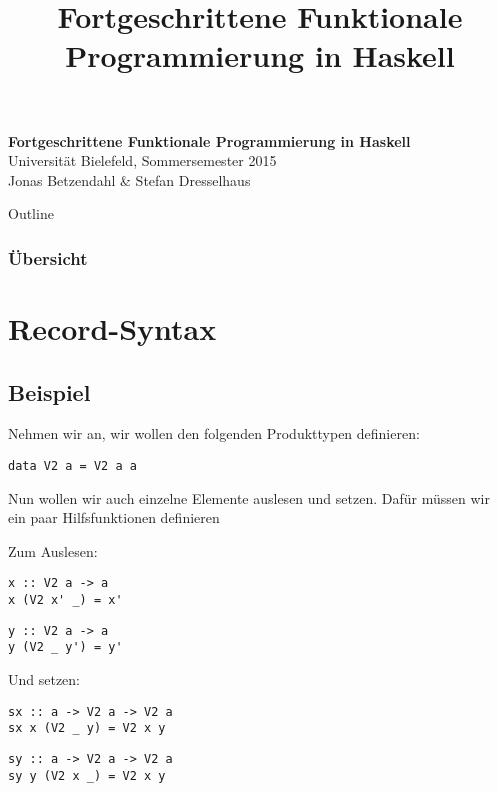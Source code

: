 \documentclass{beamer}
\title{Fortgeschrittene Funktionale Programmierung in Haskell}
\begin{document}
  

  \begin{frame}
  \begin{center}
    \Huge\textbf{Fortgeschrittene Funktionale Programmierung in Haskell}\\ \bigskip
    \LARGE Universität Bielefeld, Sommersemester 2015\\ \bigskip
    \large Jonas Betzendahl \& Stefan Dresselhaus
    \end{center}
  \end{frame}

\begin{frame}[allowframebreaks]{Outline}
\frametitle{Übersicht}
\tableofcontents[hideallsubsections]
\end{frame}

\section{Record-Syntax}

\subsection{Beispiel}

\begin{frame}[fragile]
Nehmen wir an, wir wollen den folgenden Produkttypen definieren:
\begin{verbatim}
data V2 a = V2 a a
\end{verbatim}
\pause
Nun wollen wir auch einzelne Elemente auslesen und setzen. Dafür müssen wir ein paar Hilfsfunktionen definieren
\end{frame}

\begin{frame}[fragile]
Zum Auslesen:
\pause
\begin{verbatim}
x :: V2 a -> a
x (V2 x' _) = x'
\end{verbatim}
\pause
\begin{verbatim}
y :: V2 a -> a
y (V2 _ y') = y'
\end{verbatim}
\pause
Und setzen:
\pause
\begin{verbatim}
sx :: a -> V2 a -> V2 a
sx x (V2 _ y) = V2 x y
\end{verbatim}
\pause
\begin{verbatim}
sy :: a -> V2 a -> V2 a
sy y (V2 x _) = V2 x y
\end{verbatim}
\end{frame}
\end{document}
